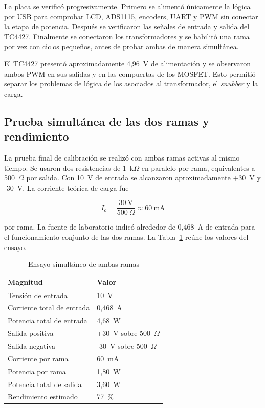 \documentclass[conference]{IEEEtran}
\begin{document}
La placa se verificó progresivamente. Primero se alimentó únicamente la lógica por USB para comprobar LCD, ADS1115, encoders, UART y PWM sin conectar la etapa de potencia. Después se verificaron las señales de entrada y salida del TC4427. Finalmente se conectaron los transformadores y se habilitó una rama por vez con ciclos pequeños, antes de probar ambas de manera simultánea.

El TC4427 presentó aproximadamente 4,96~V de alimentación y se observaron ambos PWM en sus salidas y en las compuertas de los MOSFET. Esto permitió separar los problemas de lógica de los asociados al transformador, el \textit{snubber} y la carga.

\subsection{Prueba simultánea de las dos ramas y rendimiento}

La prueba final de calibración se realizó con ambas ramas activas al mismo tiempo. Se usaron dos resistencias de 1~k$\Omega$ en paralelo por rama, equivalentes a 500~$\Omega$ por salida. Con 10~V de entrada se alcanzaron aproximadamente +30~V y -30~V. La corriente teórica de carga fue

\begin{equation}
I_o=\frac{30\ \mathrm{V}}{500\ \Omega}\approx60\ \mathrm{mA}
\end{equation}

por rama. La fuente de laboratorio indicó alrededor de 0,468~A de entrada para el funcionamiento conjunto de las dos ramas. La Tabla~\ref{tab:rendimiento} reúne los valores del ensayo.

\begin{table}[!t]
\caption{Ensayo simultáneo de ambas ramas}
\label{tab:rendimiento}
\centering
\footnotesize
\begin{tabular}{@{}ll@{}}
\toprule
\textbf{Magnitud} & \textbf{Valor} \\
\midrule
Tensión de entrada & 10~V \\
Corriente total de entrada & 0,468~A \\
Potencia total de entrada & 4,68~W \\
Salida positiva & +30~V sobre 500~$\Omega$ \\
Salida negativa & -30~V sobre 500~$\Omega$ \\
Corriente por rama & 60~mA \\
Potencia por rama & 1,80~W \\
Potencia total de salida & 3,60~W \\
Rendimiento estimado & 77~\% \\
\bottomrule
\end{tabular}
\end{table}
\end{document}
